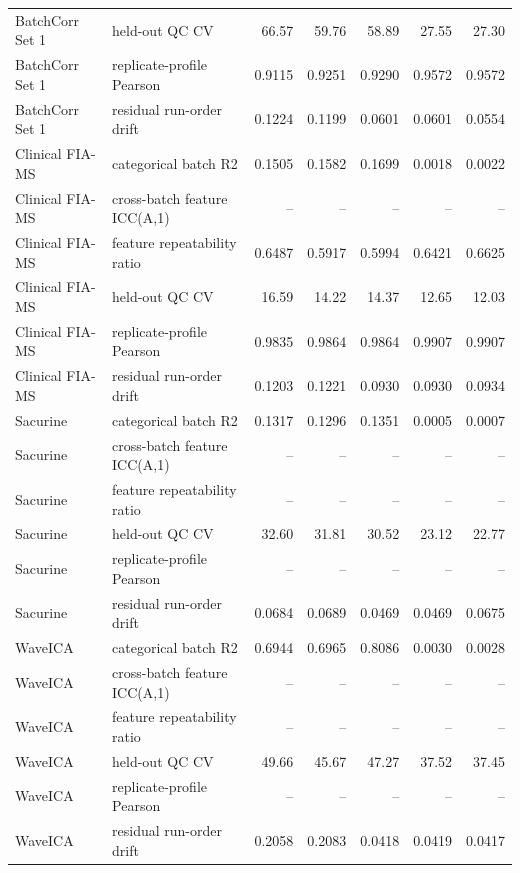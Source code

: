 \begin{landscape}
\begin{longtable}{llrrrrr}
BatchCorr Set 1 & held-out QC CV & 66.57 & 59.76 & 58.89 & 27.55 & 27.30 \\
BatchCorr Set 1 & replicate-profile Pearson & 0.9115 & 0.9251 & 0.9290 & 0.9572 & 0.9572 \\
BatchCorr Set 1 & residual run-order drift & 0.1224 & 0.1199 & 0.0601 & 0.0601 & 0.0554 \\
Clinical FIA-MS & categorical batch R2 & 0.1505 & 0.1582 & 0.1699 & 0.0018 & 0.0022 \\
Clinical FIA-MS & cross-batch feature ICC(A,1) & -- & -- & -- & -- & -- \\
Clinical FIA-MS & feature repeatability ratio & 0.6487 & 0.5917 & 0.5994 & 0.6421 & 0.6625 \\
Clinical FIA-MS & held-out QC CV & 16.59 & 14.22 & 14.37 & 12.65 & 12.03 \\
Clinical FIA-MS & replicate-profile Pearson & 0.9835 & 0.9864 & 0.9864 & 0.9907 & 0.9907 \\
Clinical FIA-MS & residual run-order drift & 0.1203 & 0.1221 & 0.0930 & 0.0930 & 0.0934 \\
Sacurine & categorical batch R2 & 0.1317 & 0.1296 & 0.1351 & 0.0005 & 0.0007 \\
Sacurine & cross-batch feature ICC(A,1) & -- & -- & -- & -- & -- \\
Sacurine & feature repeatability ratio & -- & -- & -- & -- & -- \\
Sacurine & held-out QC CV & 32.60 & 31.81 & 30.52 & 23.12 & 22.77 \\
Sacurine & replicate-profile Pearson & -- & -- & -- & -- & -- \\
Sacurine & residual run-order drift & 0.0684 & 0.0689 & 0.0469 & 0.0469 & 0.0675 \\
WaveICA & categorical batch R2 & 0.6944 & 0.6965 & 0.8086 & 0.0030 & 0.0028 \\
WaveICA & cross-batch feature ICC(A,1) & -- & -- & -- & -- & -- \\
WaveICA & feature repeatability ratio & -- & -- & -- & -- & -- \\
WaveICA & held-out QC CV & 49.66 & 45.67 & 47.27 & 37.52 & 37.45 \\
WaveICA & replicate-profile Pearson & -- & -- & -- & -- & -- \\
WaveICA & residual run-order drift & 0.2058 & 0.2083 & 0.0418 & 0.0419 & 0.0417 \\
\end{longtable}
\end{landscape}
